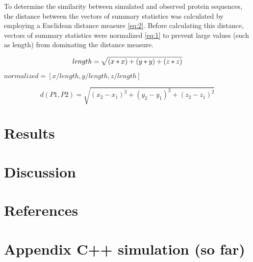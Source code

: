 \documentclass{article}
\begin{document}
To determine the similarity between simulated and observed protein sequences, the distance between the vectors of summary statistics was calculated by employing a Euclidean distance measure \eqref{eq:2}. Before calculating this distance, vectors of summary statistics were normalized \eqref{eq:1} to prevent large values (such as length) from dominating the distance measure.

\begin{equation}
	length = \sqrt{(x*x) + (y*y) + (z*z)} \\
	\label{eq:1}
\end{equation}

\begin{center}
	$normalized = [x/length, y/length, z/length]$
\end{center}

\begin{equation}
	d(P1,P2) = \sqrt{(x_2-x_1)^2 + (y_2-y_1)^2 + (z_2-z_1)^2 }
	\label{eq:2}
\end{equation}

\section{Results}





\section{Discussion}

\clearpage\newpage
\section{References}


\nocite{*}
\printbibliography[heading=none, sorting=nyt]
\newpage

\section{Appendix C++ simulation (so far)}

\end{document}
